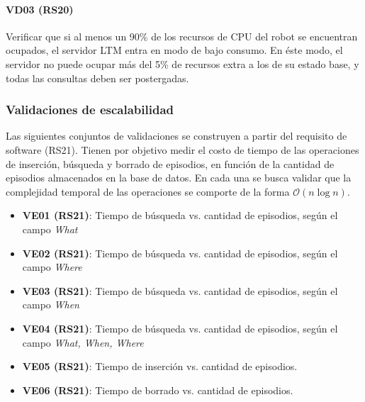 \paragraph{VD03 (RS20)}
Verificar que si al menos un 90\% de los recursos de CPU del robot se encuentran ocupados, el servidor LTM entra en modo de bajo consumo. En éste modo, el servidor no puede ocupar más del 5\% de recursos extra a los de su estado base, y todas las consultas deben ser postergadas.


\subsubsection{Validaciones de escalabilidad}

Las siguientes conjuntos de validaciones se construyen a partir del requisito de software (RS21). Tienen por objetivo medir el costo de tiempo de las operaciones de inserción, búsqueda y borrado de episodios, en función de la cantidad de episodios almacenados en la base de datos. En cada una se busca validar que la complejidad temporal de las operaciones se comporte de la forma $\mathcal{O}(n\log{}n)$.



\begin{itemize}
\item {\bf VE01 (RS21)}: Tiempo de búsqueda vs. cantidad de episodios, según el campo \textit{What}
\item {\bf VE02 (RS21)}: Tiempo de búsqueda vs. cantidad de episodios, según el campo \textit{Where}
\item {\bf VE03 (RS21)}: Tiempo de búsqueda vs. cantidad de episodios, según el campo \textit{When}
\item {\bf VE04 (RS21)}: Tiempo de búsqueda vs. cantidad de episodios, según el campo \textit{What, When, Where}
\item {\bf VE05 (RS21)}: Tiempo de inserción vs. cantidad de episodios.
\item {\bf VE06 (RS21)}: Tiempo de borrado vs. cantidad de episodios.
\end{itemize}

